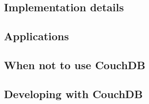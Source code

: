 \documentclass{beamer}
\begin{document}
\subsection{Implementation details}
\begin{frame}
\end{frame}

\subsection{Applications}
\begin{frame}
\end{frame}

\subsection{When not to use CouchDB}
\begin{frame}
\end{frame}

\subsection{Developing with CouchDB}
\begin{frame}
\end{frame}
\end{document}
